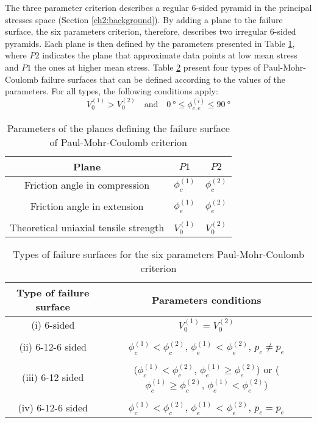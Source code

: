 The three parameter criterion describes a regular 6-sided pyramid in the principal stresses space (Section \ref{ch2:background}). By adding a plane to the failure surface, the six parameters criterion, therefore, describes two irregular 6-sided pyramids. Each plane is then defined by the parameters presented in Table \ref{tb5:pmc6p_planeparam}, where $P2$ indicates the plane that approximate data points at low mean stress and $P1$ the ones at higher mean stress. Table \ref{tb5:pmc6p_pyramids} present four types of Paul-Mohr-Coulomb failure surfaces that can be defined according to the values of the parameters. For all types, the following conditions apply: 
\begin{equation}
    V_0^{(1)} > V_0^{(2)} \quad \textrm{and} \quad \SI{0}{\degree} \leq \phi_{c,e}^{(i)} \leq \SI{90}{\degree}
\end{equation}

\begin{table}
    \centering 
    \captionsetup{justification=centering}
    \caption{Parameters of the planes defining the failure surface of Paul-Mohr-Coulomb criterion}
    \begin{tabular}{ccc}
        \hline 
        Plane & $P1$ & $P2$  \\
        \hline
        \hline
        Friction angle in compression & $\phi_{c}^{(1)}$ & $\phi_{c}^{(2)}$ \\
        \\
        Friction angle in extension & $\phi_{e}^{(1)}$ & $\phi_{e}^{(2)}$ \\ 
        \\
        Theoretical uniaxial tensile strength & $V_0^{(1)}$ & $V_0^{(2)}$ \\
        \hline
    \end{tabular}
    \label{tb5:pmc6p_planeparam}
\end{table}

\begin{table}
    \centering 
    \begin{tabular}{cc}
        \hline 
        Type of failure surface & Parameters conditions   \\
        \hline
        \hline
        (i) 6-sided & $V_0^{(1)} = V_0^{(2)}$ \\
        \\
        (ii) 6-12-6 sided & $\phi_{c}^{(1)} < \phi_{c}^{(2)}$, $\phi_{e}^{(1)}$ < $\phi_{e}^{(2)}$, $p_c \neq p_e$\\ 
        \\
        (iii) 6-12 sided & ($\phi_{c}^{(1)} < \phi_{c}^{(2)}$, $\phi_{e}^{(1)} \geq \phi_{e}^{(2)}$) or ($\phi_{c}^{(1)} \geq \phi_{c}^{(2)}$, $\phi_{e}^{(1)} < \phi_{e}^{(2)}$)\\
        \\
        (iv) 6-12-6 sided & $\phi_{c}^{(1)} < \phi_{c}^{(2)}$, $\phi_{e}^{(1)}$ < $\phi_{e}^{(2)}$, $p_c = p_e$\\ 
        \hline
    \end{tabular}
    \captionsetup{justification=centering}
    \caption{Types of failure surfaces for the six parameters Paul-Mohr-Coulomb criterion}
    \label{tb5:pmc6p_pyramids}
\end{table}

